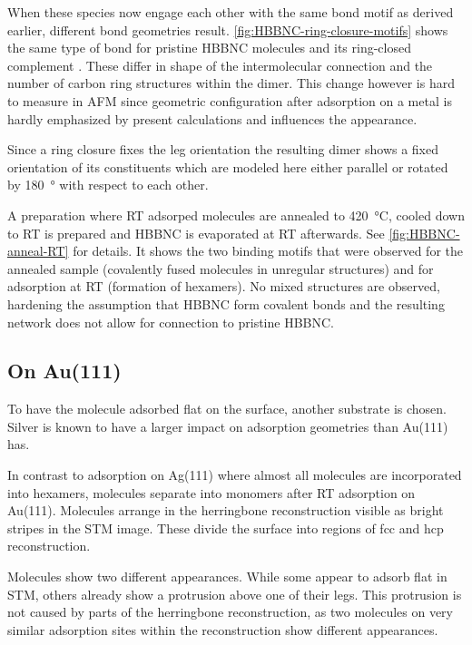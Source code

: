 When these species now engage each other with the same bond motif as derived earlier, different bond geometries result. \autoref{fig:HBBNC-ring-closure-motifs} shows the same type of bond for pristine HBBNC molecules   and its ring-closed complement . These differ in shape of the intermolecular connection and the number of carbon ring structures within the dimer. This change however is hard to measure in AFM since geometric configuration after adsorption on a metal is hardly emphasized by present calculations and influences the appearance.

Since a ring closure fixes the leg orientation the resulting dimer shows a fixed orientation of its constituents which are modeled here either parallel or rotated by \SI{180}{\degree} with respect to each other.

A preparation where RT adsorped molecules are annealed to \SI{420}{\celsius}, cooled down to RT is prepared and HBBNC is evaporated at RT afterwards. See \autoref{fig:HBBNC-anneal-RT} for details. It shows the two binding motifs that were observed for the annealed sample (covalently fused molecules in unregular structures) and for adsorption at RT (formation of hexamers). No mixed structures are observed, hardening the assumption that HBBNC form covalent bonds and the resulting network does not allow for connection to pristine HBBNC.

\subsection{On Au(111)}To have the molecule adsorbed flat on the surface, another substrate is chosen. Silver is known to have a larger impact on adsorption geometries than Au(111) has.

In contrast to adsorption on Ag(111) where almost all molecules are incorporated into hexamers, molecules separate into monomers after RT adsorption on Au(111). Molecules arrange in the herringbone reconstruction visible as bright stripes in the STM image. These divide the surface into regions of fcc and hcp reconstruction.

Molecules show two different appearances. While some appear to adsorb flat in STM, others already show a protrusion above one of their legs. This protrusion is not caused by parts of the herringbone reconstruction, as two molecules on very similar adsorption sites within the reconstruction show different appearances.


